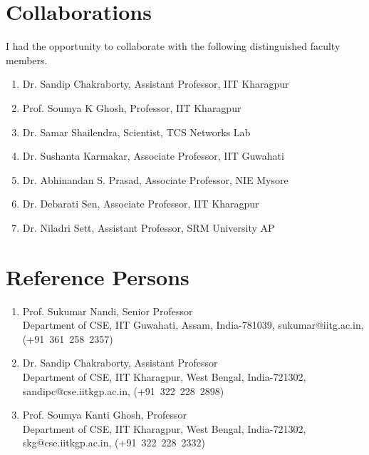 \documentclass{article}
\begin{document}
\section{Collaborations}
I had the opportunity to collaborate with the following distinguished faculty members.
  \begin{enumerate}
  	\item Dr. Sandip Chakraborty, Assistant Professor, IIT Kharagpur
	\item Prof. Soumya K Ghosh, Professor, IIT Kharagpur
	\item Dr. Samar Shailendra, Scientist, TCS Networks Lab
	\item Dr. Sushanta Karmakar, Associate Professor, IIT Guwahati
	\item Dr. Abhinandan S. Prasad, Associate Professor, NIE Mysore
	\item Dr. Debarati Sen, Associate Professor, IIT Kharagpur
	\item Dr. Niladri Sett, Assistant Professor, SRM University AP
  \end{enumerate}
\section{Reference Persons}
  \begin{enumerate}
  \item Prof. Sukumar Nandi, Senior Professor\\Department of CSE, IIT Guwahati, Assam, India-781039, sukumar@iitg.ac.in, (+91~361~258~2357)
  \item Dr. Sandip Chakraborty, Assistant Professor\\Department of CSE, IIT Kharagpur, West Bengal, India-721302, sandipc@cse.iitkgp.ac.in, (+91~322~228~2898)
  \item Prof. Soumya Kanti Ghosh, Professor\\Department of CSE, IIT Kharagpur, West Bengal, India-721302, skg@cse.iitkgp.ac.in, (+91~322~228~2332)
  \end{enumerate}
   \nocite{*}
  
  
\end{document}

